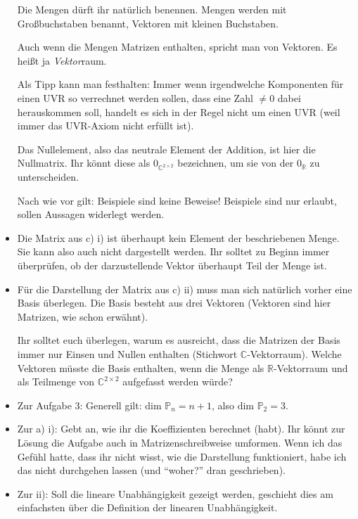 \documentclass[11pt, a4paper]{article}
\newcommand{\R}{\mathbb{R}}
\newcommand{\C}{\mathbb{C}}
\newcommand{\Poly}{\mathbb{P}}
\newcommand{\RM}[1]{\MakeUppercase{\romannumeral #1{}}}
\begin{document}
\begin{itemize}
Die Mengen dürft ihr natürlich benennen. Mengen werden mit Großbuchstaben benannt, Vektoren mit kleinen Buchstaben.

Auch wenn die Mengen Matrizen enthalten, spricht man von Vektoren. Es heißt ja \emph{Vektor}raum.

Als Tipp kann man festhalten: Immer wenn irgendwelche Komponenten für einen UVR so verrechnet werden sollen, dass eine Zahl $\neq 0$ dabei herauskommen soll, handelt es sich in der Regel nicht um einen UVR (weil immer das UVR-Axiom \RM{2} nicht erfüllt ist).

Das Nullelement, also das neutrale Element der Addition, ist hier die Nullmatrix. Ihr könnt diese als $0_{\C^{2 \times 2}}$ bezeichnen, um sie von der $0_\R$ zu unterscheiden.

Nach wie vor gilt: Beispiele sind keine Beweise! Beispiele sind nur erlaubt, sollen Aussagen widerlegt werden.

\item Die Matrix aus c) i) ist überhaupt kein Element der beschriebenen Menge. Sie kann also auch nicht dargestellt werden. Ihr solltet zu Beginn immer überprüfen, ob der darzustellende Vektor überhaupt Teil der Menge ist. 

\item Für die Darstellung der Matrix aus c) ii) muss man sich natürlich vorher eine Basis überlegen. Die Basis besteht aus drei Vektoren (Vektoren sind hier Matrizen, wie schon erwähnt).

Ihr solltet euch überlegen, warum es ausreicht, dass die Matrizen der Basis immer nur Einsen und Nullen enthalten (Stichwort $\C$-Vektorraum). Welche Vektoren müsste die Basis enthalten, wenn die Menge als $\R$-Vektorraum und als Teilmenge von $\C^{2 \times 2}$ aufgefasst werden würde?

\item Zur Aufgabe 3: Generell gilt: $\text{dim~} \Poly_n = n + 1$, also $\text{dim~} \Poly_2 = 3$.

\item Zur a) i): Gebt an, wie ihr die Koeffizienten berechnet (habt). Ihr könnt zur Lösung die Aufgabe auch in Matrizenschreibweise umformen. Wenn ich das Gefühl hatte, dass ihr nicht wisst, wie die Darstellung funktioniert, habe ich das nicht durchgehen lassen (und \enquote{woher?} dran geschrieben). 

\item Zur ii): Soll die lineare Unabhängigkeit gezeigt werden, geschieht dies am einfachsten über die Definition der linearen Unabhängigkeit.


\end{itemize}
\end{document}
